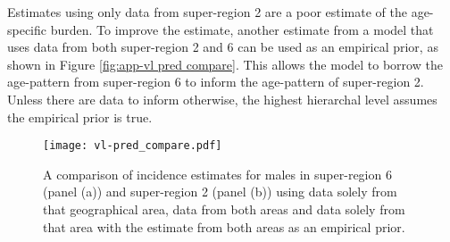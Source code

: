 Estimates using only data from super-region 2 are a poor estimate of
the age-specific burden.  To improve the estimate, another estimate
from a model that uses data from both super-region 2 and 6 can be used
as an empirical prior, as shown in Figure \ref{fig:app-vl pred
  compare}.  This allows the model to borrow the age-pattern from
super-region 6 to inform the age-pattern of super-region 2.  Unless
there are data to inform otherwise, the highest hierarchal level
assumes the empirical prior is true.

    \begin{figure}[h]
        \begin{center}
            \texttt{[image: vl-pred\_compare.pdf]}
            \caption{A comparison of incidence estimates for males in
              super-region 6 (panel (a)) and super-region 2 (panel
              (b)) using data solely from that geographical area, data
              from both areas and data solely from that area with the
              estimate from both areas as an empirical prior.}
            \label{fig:app-vl pred compare}
        \end{center}
    \end{figure}
